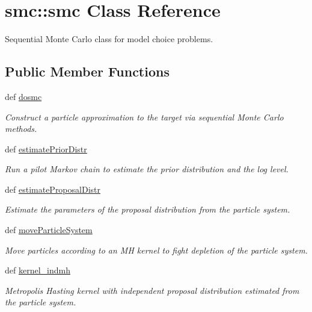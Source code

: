 \hypertarget{classsmc_1_1smc}{
\section{smc::smc Class Reference}
\label{classsmc_1_1smc}
}
Sequential Monte Carlo class for model choice problems.  


\subsection*{Public Member Functions}
\begin{CompactItemize}
\item 
def \hyperlink{classsmc_1_1smc_32f2ee107cd254620e678aac22a45d21}{dosmc}
\begin{CompactList}\small\item\em Construct a particle approximation to the target via sequential Monte Carlo methods. \item\end{CompactList}\item 
def \hyperlink{classsmc_1_1smc_e7f644f3b5cb36aa99f0ebf7b4ebc3a4}{estimatePriorDistr}
\begin{CompactList}\small\item\em Run a pilot Markov chain to estimate the prior distribution and the log level. \item\end{CompactList}\item 
def \hyperlink{classsmc_1_1smc_f567f3fc9711a87297d72cab09fea035}{estimateProposalDistr}
\begin{CompactList}\small\item\em Estimate the parameters of the proposal distribution from the particle system. \item\end{CompactList}\item 
def \hyperlink{classsmc_1_1smc_cf375f96d980adede8438b3fead19938}{moveParticleSystem}
\begin{CompactList}\small\item\em Move particles according to an MH kernel to fight depletion of the particle system. \item\end{CompactList}\item 
def \hyperlink{classsmc_1_1smc_747f9eabdfcb52a9a2ccf6ec84bfdb83}{kernel\_\-indmh}
\begin{CompactList}\small\item\em Metropolis Hasting kernel with independent proposal distribution estimated from the particle system. \item\end{CompactList}\item 

\end{CompactItemize}
